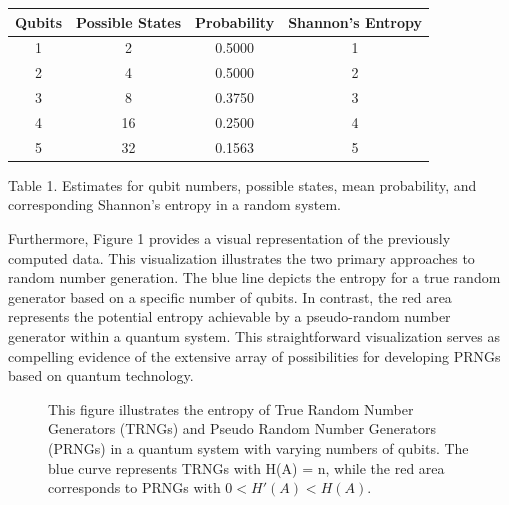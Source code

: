 \documentclass[12pt]{article}
\begin{document}
	 		\begin{center}
	 			\begin{tabular}{ |c|c|c|c| } 
	 				\hline
	 				Qubits  & Possible States  & Probability & Shannon’s Entropy\\
	 				\hline
	 				1 & 2 & 0.5000 & 1 \\ 
	 				2 & 4 & 0.5000 & 2 \\ 
	 				3 & 8 & 0.3750 & 3 \\ 
	 				4 & 16 & 0.2500 & 4 \\ 
	 				5 & 32 & 0.1563 & 5 \\ 
	 				\hline
	 			\end{tabular}
	 		\end{center}
	   		{Table 1. Estimates for qubit numbers, possible states, mean probability, and corresponding Shannon’s entropy in a random
	   		system.\\\par
	   		Furthermore, Figure 1 provides a visual representation of the previously computed data. This visualization illustrates the
	   		two primary approaches to random number generation. The blue line depicts the entropy for a true random generator based on a
	   		specific number of qubits. In contrast, the red area represents the potential entropy achievable by a pseudo-random number
	   		generator within a quantum system. This straightforward visualization serves as compelling evidence of the extensive array of
	   		possibilities for developing PRNGs based on quantum technology.}
	   		
	   		\begin{figure}
	   		\caption{  This figure illustrates the entropy of True Random Number Generators (TRNGs) and Pseudo Random Number
	   		Generators (PRNGs) in a quantum system with varying numbers of qubits. The blue curve represents TRNGs with H(A) = n,
	   		while the red area corresponds to PRNGs with $0 < H'(A) < H(A)$.}
	   		\end{figure}
	   		
\end{document}
